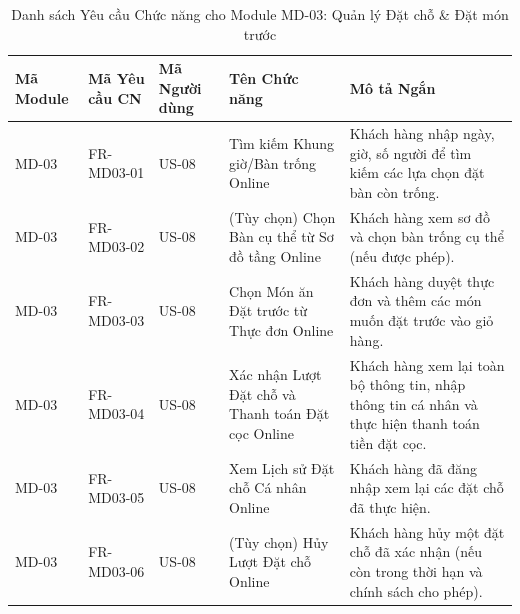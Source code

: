 \begin{longtable}{|m{2cm}|m{2.5cm}|m{2cm}|m{4.5cm}|m{4cm}|}
\caption{Danh sách Yêu cầu Chức năng cho Module MD-03: Quản lý Đặt chỗ \& Đặt món trước} \label{tab:fr_md03_revised_v3} \\
\hline
\textbf{Mã Module} & \textbf{Mã Yêu cầu CN} & \textbf{Mã Người dùng} & \textbf{Tên Chức năng} & \textbf{Mô tả Ngắn} \\
\hline
\endhead %
\hline
\endfoot %
\hline
\endlastfoot %

MD-03 & FR-MD03-01 & US-08 & Tìm kiếm Khung giờ/Bàn trống Online & Khách hàng nhập ngày, giờ, số người để tìm kiếm các lựa chọn đặt bàn còn trống. \\
\hline
MD-03 & FR-MD03-02 & US-08 & (Tùy chọn) Chọn Bàn cụ thể từ Sơ đồ tầng Online & Khách hàng xem sơ đồ và chọn bàn trống cụ thể (nếu được phép). \\
\hline
MD-03 & FR-MD03-03 & US-08 & Chọn Món ăn Đặt trước từ Thực đơn Online & Khách hàng duyệt thực đơn và thêm các món muốn đặt trước vào giỏ hàng. \\
\hline
MD-03 & FR-MD03-04 & US-08 & Xác nhận Lượt Đặt chỗ và Thanh toán Đặt cọc Online & Khách hàng xem lại toàn bộ thông tin, nhập thông tin cá nhân và thực hiện thanh toán tiền đặt cọc. \\
\hline
MD-03 & FR-MD03-05 & US-08 & Xem Lịch sử Đặt chỗ Cá nhân Online & Khách hàng đã đăng nhập xem lại các đặt chỗ đã thực hiện. \\
\hline
MD-03 & FR-MD03-06 & US-08 & (Tùy chọn) Hủy Lượt Đặt chỗ Online & Khách hàng hủy một đặt chỗ đã xác nhận (nếu còn trong thời hạn và chính sách cho phép). \\
\hline


\end{longtable}
